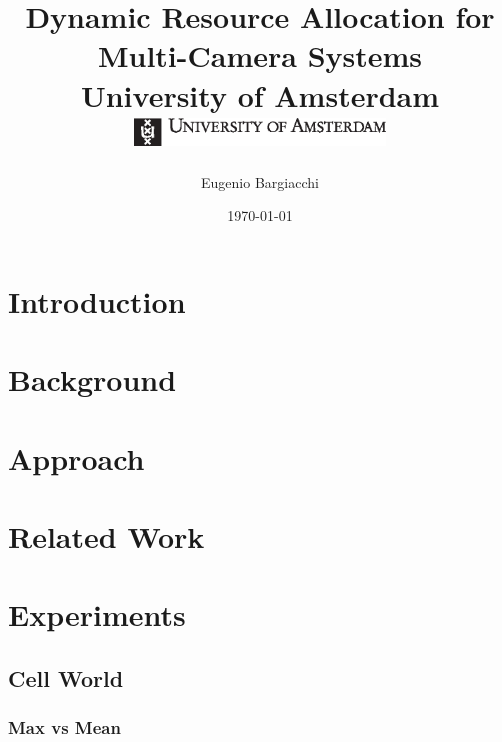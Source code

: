 \documentclass[10pt,twoside]{report}
\title{
    {Dynamic Resource Allocation for Multi-Camera Systems}\\
    {University of Amsterdam}\\\vspace{1cm}
    {\includegraphics[width=0.5\textwidth]{UvA-logo}}
}
\author{Eugenio Bargiacchi}
\date{\today}
\begin{document}
\maketitle


\tableofcontents

\chapter{Introduction}\label{ref:intro}


\chapter{Background}\label{ref:background}



\chapter{Approach}\label{ref:approach}


\chapter{Related Work}\label{ref:relwork}


\chapter{Experiments}\label{ref:experiments}
    \section{Cell World}
        \subsection{Max vs Mean}
\end{document}
